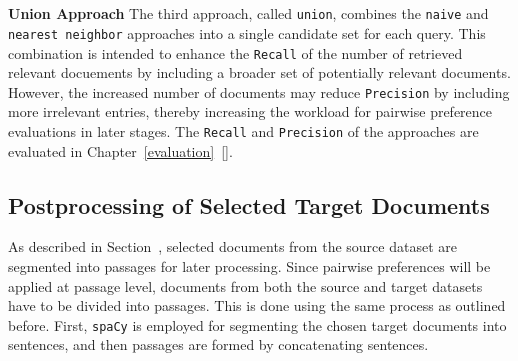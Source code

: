\\\\
\textbf{Union Approach}
The third approach, called \texttt{union}, combines the \texttt{naive} and \texttt{nearest neighbor} approaches into a single candidate set for each query. This combination is intended to enhance the \texttt{Recall} of the number of retrieved relevant docuements by including a broader set of potentially relevant documents. However, the increased number of documents may reduce \texttt{Precision} by including more irrelevant entries, thereby increasing the workload for pairwise preference evaluations in later stages. The \texttt{Recall} and \texttt{Precision} of the approaches are evaluated in Chapter~\ref{evaluation}~[].

\subsection{Postprocessing of Selected Target Documents}\label{postprocessing-of-selected-target-documents}
As described in Section~, selected documents from the source dataset are segmented into passages for later processing. Since pairwise preferences will be applied at passage level, documents from both the source and target datasets have to be divided into passages. This is done using the same process as outlined before. First, \texttt{spaCy} is employed for segmenting the chosen target documents into sentences, and then passages are formed by concatenating sentences.

